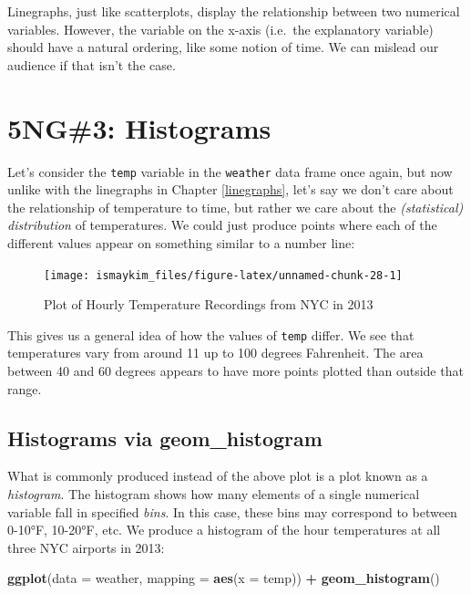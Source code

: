 \documentclass[12pt,]{krantz}
\makeatletter
\newenvironment{Shaded}{\begin{snugshade}}{\end{snugshade}}
\newcommand{\KeywordTok}[1]{\textcolor[rgb]{0.27,0.27,0.27}{\textbf{#1}}}
\newcommand{\DataTypeTok}[1]{\textcolor[rgb]{0.27,0.27,0.27}{#1}}
\newcommand{\StringTok}[1]{\textcolor[rgb]{0.5,0.5,0.5}{#1}}
\newcommand{\OperatorTok}[1]{\textcolor[rgb]{0.43,0.43,0.43}{\textbf{#1}}}
\newcommand{\NormalTok}[1]{#1}
\newenvironment{kframe}{%
\medskip{}
\setlength{\fboxsep}{.8em}
 \def\at@end@of@kframe{}%
 \ifinner\ifhmode%
  \def\at@end@of@kframe{\end{minipage}}%
  \begin{minipage}{\columnwidth}%
 \fi\fi%
 \def\FrameCommand##1{\hskip\@totalleftmargin \hskip-\fboxsep
 \colorbox{shadecolor}{##1}\hskip-\fboxsep
     \hskip-\linewidth \hskip-\@totalleftmargin \hskip\columnwidth}%
 \MakeFramed {\advance\hsize-\width
   \@totalleftmargin\z@ \linewidth\hsize
   \@setminipage}}%
 {\par\unskip\endMakeFramed%
 \at@end@of@kframe}
\renewenvironment{Shaded}{\begin{kframe}}{\end{kframe}}
\makeatother
\begin{document}
Linegraphs, just like scatterplots, display the relationship between two
numerical variables. However, the variable on the x-axis (i.e.~the
explanatory variable) should have a natural ordering, like some notion
of time. We can mislead our audience if that isn't the case.

\section{5NG\#3: Histograms}\label{histograms}

Let's consider the \texttt{temp} variable in the \texttt{weather} data
frame once again, but now unlike with the linegraphs in Chapter
\ref{linegraphs}, let's say we don't care about the relationship of
temperature to time, but rather we care about the \emph{(statistical)
distribution} of temperatures. We could just produce points where each
of the different values appear on something similar to a number line:

\begin{figure}

{\centering \texttt{[image: ismaykim\_files/figure-latex/unnamed-chunk-28-1]} 

}

\caption{Plot of Hourly Temperature Recordings from NYC in 2013}\label{fig:unnamed-chunk-28}
\end{figure}

This gives us a general idea of how the values of \texttt{temp} differ.
We see that temperatures vary from around 11 up to 100 degrees
Fahrenheit. The area between 40 and 60 degrees appears to have more
points plotted than outside that range.

\subsection{Histograms via geom\_histogram}\label{geomhistogram}

What is commonly produced instead of the above plot is a plot known as a
\emph{histogram}. The histogram shows how many elements of a single
numerical variable fall in specified \emph{bins}. In this case, these
bins may correspond to between 0-10°F, 10-20°F, etc. We produce a
histogram of the hour temperatures at all three NYC airports in 2013:

\begin{Shaded}
\begin{Highlighting}[]
\KeywordTok{ggplot}\NormalTok{(}\DataTypeTok{data =}\NormalTok{ weather, }\DataTypeTok{mapping =} \KeywordTok{aes}\NormalTok{(}\DataTypeTok{x =}\NormalTok{ temp)) }\OperatorTok{+}
\StringTok{  }\KeywordTok{geom_histogram}\NormalTok{()}
\end{Highlighting}
\end{Shaded}
\end{document}
